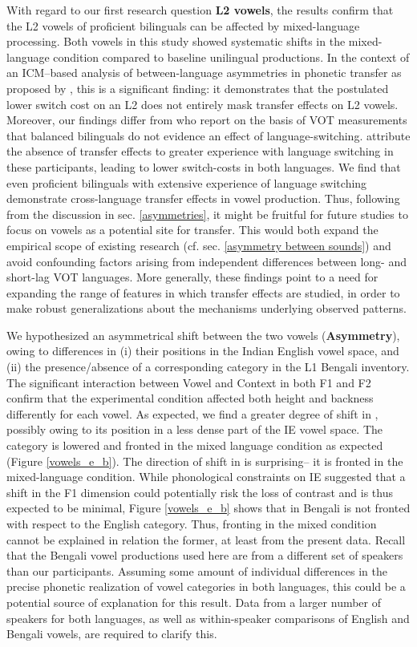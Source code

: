 \documentclass[12 pt]{article}
\newcommand{\nt}[1]{\textipa{[#1]}} %
\begin{document}
With regard to our first research question \textbf{L2 vowels}, the results confirm that the L2 vowels of proficient bilinguals can be affected by mixed-language processing. Both vowels in this study showed systematic shifts in the mixed-language condition compared to baseline unilingual productions. In the context of an ICM--based analysis of between-language asymmetries in phonetic transfer as proposed by \cite{olson2013bilingual}, this is a significant finding: it demonstrates that the postulated lower switch cost on an L2 does not entirely mask transfer effects on L2 vowels. Moreover, our findings differ from \cite{tsui2019impact} who report on the basis of VOT measurements that balanced bilinguals do not evidence an effect of language-switching. \citeauthor{tsui2019impact} attribute the absence of transfer effects to greater experience with language switching in these participants, leading to lower switch-costs in both languages. We find that even proficient bilinguals with extensive experience of language switching demonstrate cross-language transfer effects in vowel production. Thus, following from the discussion in sec. \ref{asymmetries}, it might be fruitful for future studies to focus on vowels as a potential site for transfer. This would both expand the empirical scope of existing research (cf. sec. \ref{asymmetry between sounds}) and avoid confounding factors arising from independent differences between long- and short-lag VOT languages. More generally, these findings point to a need for expanding the range of features in which transfer effects are studied, in order to make robust generalizations about the mechanisms underlying observed patterns.

We hypothesized an asymmetrical shift between the two vowels (\textbf{Asymmetry}), owing to differences in (i) their positions in the Indian English vowel space, and (ii) the presence/absence of a corresponding category in the L1 Bengali inventory. The significant interaction between Vowel and Context in both F1 and F2 confirm that the experimental condition affected both height and backness differently for each vowel. As expected, we find a greater degree of shift in \nt{2}, possibly owing to its position in a less dense part of the IE vowel space. The category \nt{2} is lowered and fronted in the mixed language condition as expected (Figure \ref{vowels_e_b}). The direction of shift in \nt{\ae} is surprising-- it is fronted in the mixed-language condition. While phonological constraints on IE suggested that a shift in the F1 dimension could potentially risk the loss of contrast and is thus expected to be minimal, Figure \ref{vowels_e_b} shows that \nt{\ae} in Bengali is not fronted with respect to the English category. Thus, fronting in the mixed condition cannot be explained in relation the former, at least from the present data. Recall that the Bengali vowel productions used here are from a different set of speakers than our participants. Assuming some amount of individual differences in the precise phonetic realization of vowel categories in both languages, this could be a potential source of explanation for this result. Data from a larger number of speakers for both languages, as well as within-speaker comparisons of English and Bengali vowels, are required to clarify this. 
\end{document}

